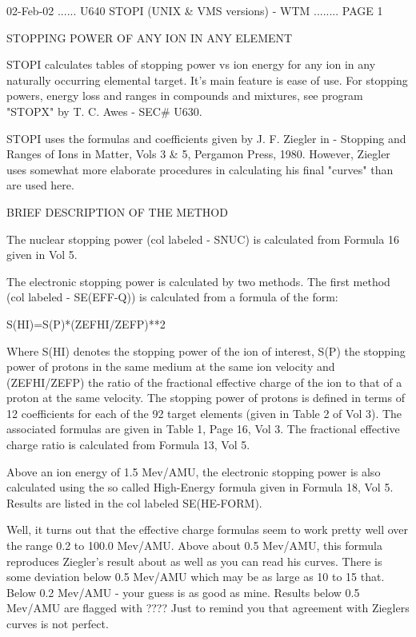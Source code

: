    02-Feb-02 ...... U640  STOPI (UNIX & VMS versions) -  WTM ........ PAGE   1
 
 
                    STOPPING POWER OF ANY ION IN ANY ELEMENT
 
   STOPI  calculates tables of stopping power vs ion energy for any ion in any
   naturally occurring elemental target. It's main feature  is  ease  of  use.
   For  stopping powers, energy loss and ranges in compounds and mixtures, see
   program "STOPX" by T. C. Awes - SEC# U630.
 
   STOPI uses the formulas and coefficients  given  by  J.  F.  Ziegler  in  -
   Stopping  and  Ranges  of Ions in Matter, Vols 3 & 5, Pergamon Press, 1980.
   However, Ziegler uses somewhat more  elaborate  procedures  in  calculating
   his final "curves" than are used here.
 
                         BRIEF DESCRIPTION OF THE METHOD
 
   The  nuclear stopping power (col labeled - SNUC) is calculated from Formula
   16 given in Vol 5.
 
   The electronic stopping power is  calculated  by  two  methods.  The  first
   method (col labeled - SE(EFF-Q)) is calculated from a formula of the form:
 
   S(HI)=S(P)*(ZEFHI/ZEFP)**2
 
   Where  S(HI)  denotes  the  stopping power of the ion of interest, S(P) the
   stopping power of protons in the same medium at the same ion  velocity  and
   (ZEFHI/ZEFP)  the  ratio  of  the fractional effective charge of the ion to
   that of a proton at the same velocity. The stopping  power  of  protons  is
   defined  in  terms  of  12  coefficients for each of the 92 target elements
   (given in Table 2 of Vol 3). The associated formulas are given in Table  1,
   Page  16,  Vol  3. The fractional effective charge ratio is calculated from
   Formula 13, Vol 5.
 
   Above an ion energy of 1.5 Mev/AMU, the electronic stopping power  is  also
   calculated  using  the  so  called High-Energy formula given in Formula 18,
   Vol 5. Results are listed in the col labeled SE(HE-FORM).
 
   Well, it turns out that the effective charge formulas seem to  work  pretty
   well  over  the  range  0.2 to 100.0 Mev/AMU. Above about 0.5 Mev/AMU, this
   formula reproduces Ziegler's result about as  well  as  you  can  read  his
   curves.  There is some deviation below 0.5 Mev/AMU which may be as large as
   10 to 15%
   that.  Below 0.2 Mev/AMU - your guess is as good as mine. Results below 0.5
   Mev/AMU are flagged with ????  Just  to  remind  you  that  agreement  with
   Zieglers curves is not perfect.
 
